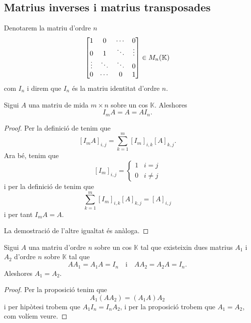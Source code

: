 \documentclass[../../Main.tex]{subfiles}
\begin{document}
	\subsection{Matrius inverses i matrius transposades}
	\begin{notation}
		\label{notation:matriu identitat}
		Denotarem la matriu d'ordre \(n\)
		\[\left[\begin{matrix}
		1 & 0 & \cdots & 0 \\
		0 & 1 & \ddots & \vdots \\
		\vdots & \ddots & \ddots & 0\\
		0 & \cdots & 0 & 1
		\end{matrix}\right]
		\in\matrius_{n}(\mathbb{K})\]
		com \(I_{n}\) i direm que \(I_{n}\) és la matriu identitat d'ordre \(n\).
	\end{notation}
	\begin{proposition}
		\label{prop:producte per la matriu identitat}
		Sigui \(A\) una matriu de mida \(m\times n\) sobre un cos \(\mathbb{K}\). Aleshores
		\[
		    I_{m}A=A=AI_{n}.
		\]
		\begin{proof}
			Per la definició de  tenim que
			\[
			    [I_{m}A]_{i,j}=\sum_{k=1}^{m}[I_{m}]_{i,k}[A]_{k,j}.
			\]
			Ara bé, tenim que
			\[[I_{m}]_{i,j}=
			\begin{cases}
			1 & i=j\\
			0 & i\neq j
			\end{cases}\]
			i per la definició de  tenim que
			\[
			    \sum_{k=1}^{m}[I_{m}]_{i,k}[A]_{k,j}=[A]_{i,j}
			\]
			i per tant \(I_{m}A=A\).
			
			La demostració de l'altre igualtat és anàloga.
		\end{proof}
	\end{proposition}
	\begin{proposition}
		\label{prop:unicitat inverses de matrius pel producte}
		Sigui \(A\) una matriu d'ordre \(n\) sobre un cos \(\mathbb{K}\) tal que existeixin dues matrius \(A_{1}\) i \(A_{2}\) d'ordre \(n\) sobre \(\mathbb{K}\) tal que
		\[
		    AA_{1}=A_{1}A=I_{n}\quad\text{i}\quad AA_{2}=A_{2}A=I_{n}.
		\]
		Aleshores \(A_{1}=A_{2}\).
		\begin{proof}
			Per la proposició  tenim que
			\[
			    A_{1}(AA_{2})=(A_{1}A)A_{2}
			\]
			i per hipòtesi trobem que \(A_{1}I_{n}=I_{n}A_{2}\), i per la proposició  trobem que \(A_{1}=A_{2}\), com volíem veure.
		\end{proof}
	\end{proposition}
\end{document}
